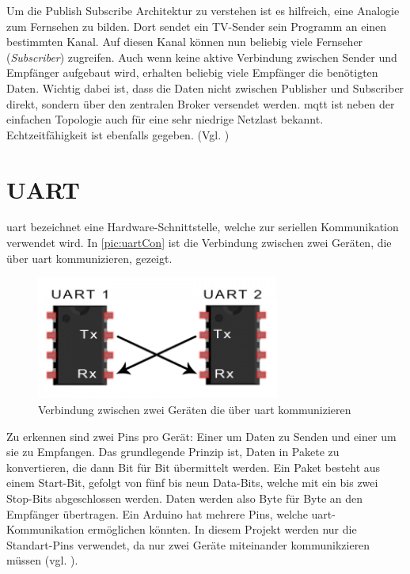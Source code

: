 Um die Publish Subscribe Architektur zu verstehen ist es hilfreich, eine Analogie zum Fernsehen zu bilden. Dort sendet ein TV-Sender sein Programm an einen bestimmten Kanal.
Auf diesen Kanal können nun beliebig viele Fernseher (\textit{Subscriber}) zugreifen. Auch wenn keine aktive Verbindung zwischen Sender und Empfänger aufgebaut wird, erhalten beliebig viele Empfänger die benötigten Daten.
Wichtig dabei ist, dass die Daten nicht zwischen Publisher und Subscriber direkt, sondern über den zentralen Broker versendet werden. \acrshort{mqtt} ist neben der einfachen Topologie auch für eine sehr niedrige Netzlast bekannt. Echtzeitfähigkeit ist ebenfalls gegeben. (Vgl. \cite{mqtt})



\section{UART}
\label{sec:uart}
\acrfull{uart} bezeichnet eine Hardware-Schnittstelle, welche zur seriellen Kommunikation verwendet wird. In \autoref{pic:uartCon} ist die Verbindung zwischen zwei Geräten, die über \acrshort{uart} kommunizieren, gezeigt.
\begin{figure}[h]
    \begin{center}
        \includegraphics[width=8cm]{uart.PNG}
        \caption{\label{pic:uartCon}Verbindung zwischen zwei Geräten die über \acrshort{uart} kommunizieren}
    \end{center}
\end{figure}
Zu erkennen sind zwei Pins pro Gerät: Einer um Daten zu Senden und einer um sie zu Empfangen. Das grundlegende Prinzip ist, Daten in Pakete zu konvertieren, die dann Bit für Bit übermittelt werden. Ein Paket besteht aus einem Start-Bit, gefolgt von fünf bis neun Data-Bits, welche mit ein bis zwei Stop-Bits abgeschlossen werden. Daten werden also Byte für Byte an den Empfänger übertragen. Ein Arduino hat mehrere Pins, welche \acrshort{uart}-Kommunikation ermöglichen könnten. In diesem Projekt werden nur die Standart-Pins verwendet, da nur zwei Geräte miteinander kommunikzieren müssen (vgl. \cite{uart}). 
\newpage
